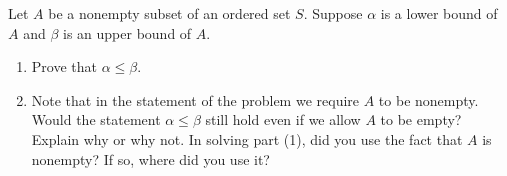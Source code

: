 \documentclass[12pt,letterpaper,reqno]{amsart}
\numberwithin{equation}{section}
\newcommand{\R}{\ensuremath{\mathbb R}}
\newcommand{\Q}{\ensuremath{\mathbb Q}}
\newcommand{\bbQ}{\ensuremath{\mathbb Q}}
\newcommand{\ti}[1]{\textit{#1}}
\begin{document}



\begin{exercise}[8 points]
 
Let $A$ be a nonempty subset of an ordered set $S$. Suppose $\alpha$ is a lower bound of $A$ and
$\beta$ is an upper bound of $A$. 

\begin{enumerate}
\item Prove that $\alpha \le \beta$.
\item Note that in the statement of the problem we require $A$ to be nonempty. Would the statement $\alpha \le \beta$ still hold even
if we allow $A$ to be empty? Explain why or why not. In solving part (1), did you use the fact that $A$ is nonempty?
If so, where did you use it?
\end{enumerate}

\end{exercise}




\end{document}
